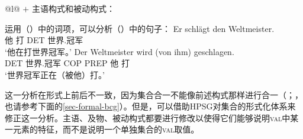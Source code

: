 \ex
\label{ex-schlagen-passive}
\begin{tabular}[t]{@{}l@{}}
 $+$ 主语构式和被动构式：\\
\end{tabular}
\zl
运用（）中的词项，可以分析（）中的句子：
\eal
\label{ex-cxg-weltmeister}
\ex 
\gll Er schlägt den Weltmeister.\\
	 他 打 DET 世界.冠军\\
\glt `他在打世界冠军。'
\ex 
\gll Der Weltmeister wird (von ihm) geschlagen.\\
	 DET 世界.冠军 COP \spacebr{}PREP 他 打\\
\glt `世界冠军正在（被他）打。'
\zl

\noindent
这一分析在形式上前后不一致，因为集合合一不能像前述构式那样进行合一（\citealp{Mueller2006d}；\citealp[\S~7.5.2]{MuellerLehrbuch1}，也请参考下面的\ref{sec-formal-bcg}）。但是，可以借助HPSG对集合的形式化体系来修正这一分析\citep{ps,PM90}。主语、及物、被动构式都要进行修改以使得它们能够说明\textsc{val}中某一元素的特征，而不是说明一个单独集合的\textsc{val}取值。

